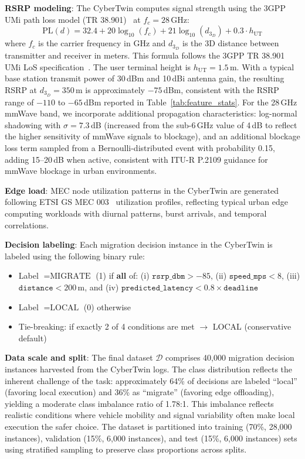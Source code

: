 \documentclass[journal,twoside]{IEEEtran}
\begin{document}
\textbf{RSRP modeling}: The CyberTwin computes signal strength using the 3GPP UMi path loss model (TR 38.901)~\cite{3gpp2018ts} at $f_c = 28$\,GHz:
\begin{equation}
\text{PL}(d) = 32.4 + 20 \log_{10}(f_c) + 21 \log_{10}(d_{3_D}) + 0.3 \cdot h_{\text{UT}}
\label{eq:pathloss}
\end{equation}
where $f_c$ is the carrier frequency in GHz and $d_{3_D}$ is the 3D distance between transmitter and receiver in meters. This formula follows the 3GPP TR 38.901 UMi LoS specification~\cite{3gpp2018ts}. The user terminal height is $h_{\text{UT}} = 1.5$\,m. With a typical base station transmit power of 30\,dBm and 10\,dBi antenna gain, the resulting RSRP at $d_{3_D}=350$\,m is approximately $-75$\,dBm, consistent with the RSRP range of $-110$ to $-65$\,dBm reported in Table~\ref{tab:feature_stats}. For the 28\,GHz mmWave band, we incorporate additional propagation characteristics: log-normal shadowing with $\sigma = 7.3$\,dB (increased from the sub-6\,GHz value of 4\,dB to reflect the higher sensitivity of mmWave signals to blockage), and an additional blockage loss term sampled from a Bernoulli-distributed event with probability 0.15, adding 15--20\,dB when active, consistent with ITU-R P.2109 guidance for mmWave blockage in urban environments.

\textbf{Edge load}: MEC node utilization patterns in the CyberTwin are generated following ETSI GS MEC 003~\cite{etsi_mec003} utilization profiles, reflecting typical urban edge computing workloads with diurnal patterns, burst arrivals, and temporal correlations.

\textbf{Decision labeling}: Each migration decision instance in the CyberTwin is labeled using the following binary rule:
\begin{itemize}
    \item Label $= \text{MIGRATE}$ (1) if \textbf{all} of: (i) $\texttt{rsrp\_dbm} > -85$, (ii) $\texttt{speed\_mps} < 8$, (iii) $\texttt{distance} < 200$\,m, and (iv) $\texttt{predicted\_latency} < 0.8 \times \texttt{deadline}$
    \item Label $= \text{LOCAL}$ (0) otherwise
    \item Tie-breaking: if exactly 2 of 4 conditions are met $\rightarrow$ LOCAL (conservative default)
\end{itemize}

\textbf{Data scale and split}: The final dataset $\mathcal{D}$ comprises 40,000 migration decision instances harvested from the CyberTwin logs. The class distribution reflects the inherent challenge of the task: approximately 64\% of decisions are labeled ``local'' (favoring local execution) and 36\% as ``migrate'' (favoring edge offloading), yielding a moderate class imbalance ratio of 1.78:1. This imbalance reflects realistic conditions where vehicle mobility and signal variability often make local execution the safer choice. The dataset is partitioned into training (70\%, 28,000 instances), validation (15\%, 6,000 instances), and test (15\%, 6,000 instances) sets using stratified sampling to preserve class proportions across splits.
\end{document}
